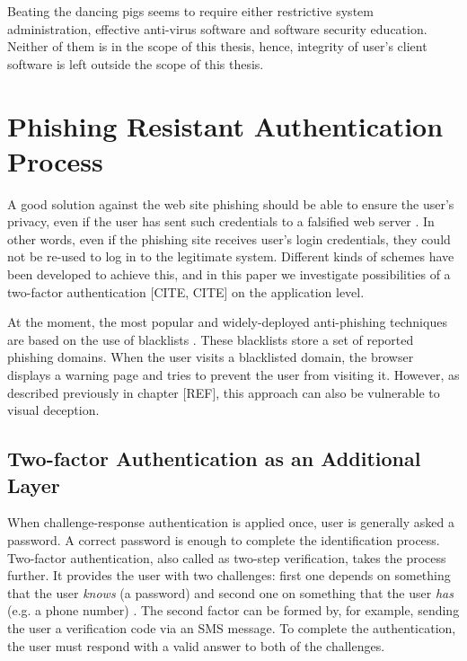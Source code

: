 \documentclass{tktltiki}
\begin{document}
    Beating the dancing pigs \cite{schneier_secrets_and_lies_2000} seems to require either restrictive system administration, effective anti-virus software and software security education. Neither of them is in the scope of this thesis, hence, integrity of user's client software is left outside the scope of this thesis.

      
      
      
    
\section{Phishing Resistant Authentication Process}

    A good solution against the web site phishing should be able to ensure the user's privacy, even if the user has sent such credentials to a falsified web server \cite{phishing_attacks_and_solutions_2007}. In other words, even if the phishing site receives user's login credentials, they could not be re-used to log in to the legitimate system. Different kinds of schemes have been developed to achieve this, and in this paper we investigate possibilities of a two-factor authentication \cite{NIST_SP800-63, schneier_2factor_2005, google_2step_2010}[CITE, CITE] on the application level.

    At the moment, the most popular and widely-deployed anti-phishing techniques are based on the use of blacklists \cite{visual_similarity_phishing_2008}. These blacklists store a set of reported phishing domains. When the user visits a blacklisted domain, the browser displays a warning page and tries to prevent the user from visiting it. However, as described previously in chapter [REF], this approach can also be vulnerable to visual deception.



\subsection{Two-factor Authentication as an Additional Layer}

    When challenge-response authentication is applied once, user is generally asked a password. A correct password is enough to complete the identification process. Two-factor authentication, also called as two-step verification, takes the process further. It provides the user with two challenges: first one depends on something that the user \emph{knows} (a password) and second one on something that the user \emph{has} (e.g. a phone number) \cite{NIST_SP800-63}. The second factor can be formed by, for example, sending the user a verification code via an SMS message. To complete the authentication, the user must respond with a valid answer to both of the challenges.
\end{document}
